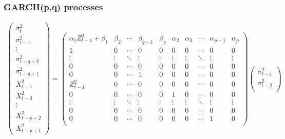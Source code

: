 \documentclass{beamer}
\begin{document}
\begin{frame}
  \frametitle{GARCH(p,q) processes}
  \begin{tiny}
    \begin{eqnarray*}
        \begin{pmatrix}
          \sigma_{t}^2 \\
          \sigma_{t-1}^2 \\
          \vdots \\
          \sigma_{t-q+2}^2 \\
          \sigma_{t-q+1}^2 \\
          X_{t-1}^2 \\
          X_{t-2}^2 \\
          \vdots \\
          X_{t-p+2}^2 \\
          X_{t-p+1}^2
        \end{pmatrix}
        =
        \begin{pmatrix}
          \alpha_1 Z_{t-1}^2 + \beta_1 & \beta_2 & \cdots &
          \beta_{q-1} & \beta_q & \alpha_2 & \alpha_3 & \cdots & \alpha_{p-1} & \alpha_p \\
          1 & 0 & \cdots & 
          0 & 0 & 0 & 0 & \cdots & 0 & 0 \\
          \vdots & \vdots & \ddots & 
          \vdots & \vdots & \vdots & \vdots & \ddots & \vdots & \vdots \\
          0 & 0 & \cdots &
          0 & 0 & 0 & 0 & \cdots & 0 & 0 \\
          0 & 0 & \cdots &
          1 & 0 & 0 & 0 & \cdots & 0 & 0 \\
          Z_{t-1}^2 & 0 & \cdots &
          0 & 0 & 0 & 0 & \cdots & 0 & 0 \\
          0 & 0 & \cdots &
          0 & 0 & 1 & 0 & \cdots & 0 & 0 \\
          \vdots & \vdots & \ddots &
          \vdots & \vdots & \vdots & \vdots & \ddots & \vdots & \vdots \\
          0 & 0 & \cdots &
          0 & 0 & 0 & 0 & \cdots & 0 & 0 \\    
          0 & 0 & \cdots &
          0 & 0 & 0 & 0 & \cdots & 1 & 0 \\    
        \end{pmatrix}
        \begin{pmatrix}
          \sigma_{t-1}^2 \\
          \sigma_{t-2}^2 \\

\end{pmatrix}
\end{eqnarray*}
\end{tiny}
\end{frame}
\end{document}
